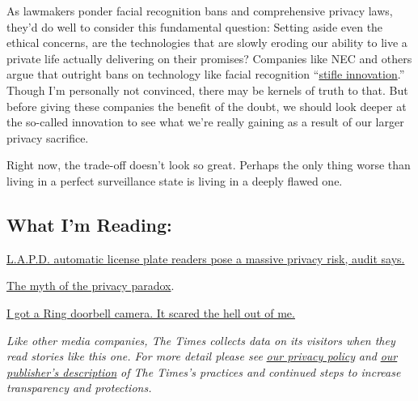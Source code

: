 As lawmakers ponder facial recognition bans and comprehensive privacy
laws, they'd do well to consider this fundamental question: Setting
aside even the ethical concerns, are the technologies that are slowly
eroding our ability to live a private life actually delivering on their
promises? Companies like NEC and others argue that outright bans on
technology like facial recognition
``\href{https://onezero.medium.com/nec-is-the-most-important-facial-recognition-company-youve-never-heard-of-12381d530510}{stifle
innovation}.'' Though I'm personally not convinced, there may be kernels
of truth to that. But before giving these companies the benefit of the
doubt, we should look deeper at the so-called innovation to see what
we're really gaining as a result of our larger privacy sacrifice.

Right now, the trade-off doesn't look so great. Perhaps the only thing
worse than living in a perfect surveillance state is living in a deeply
flawed one.

\hypertarget{what-im-reading}{%
\subsection{What I'm Reading:}\label{what-im-reading}}

\href{https://www.latimes.com/california/story/2020-02-13/privacy-risks-automatic-license-plate-readers-lapd}{L.A.P.D.
automatic license plate readers pose a massive privacy risk, audit
says.}

\href{https://papers.ssrn.com/sol3/papers.cfm?abstract_id=3536265}{The
myth of the privacy paradox}.

\href{https://nymag.com/intelligencer/2020/02/what-its-like-to-own-an-amazon-ring-doorbell-camera.html?utm_campaign=nym\&utm_medium=s1\&utm_source=tw}{I
got a Ring doorbell camera. It scared the hell out of me.}

\emph{Like other media companies, The Times collects data on its
visitors when they read stories like this one. For more detail please
see}
\href{https://help.nytimes.com/hc/en-us/articles/115014892108-Privacy-policy?module=inline}{\emph{our
privacy policy}} \emph{and}
\href{https://www.nytimes.com/2019/04/10/opinion/sulzberger-new-york-times-privacy.html?rref=collection\%2Fspotlightcollection\%2Fprivacy-project-does-privacy-matter\&action=click\&contentCollection=opinion\&region=stream\&module=stream_unit\&version=latest\&contentPlacement=8\&pgtype=collection}{\emph{our
publisher's description}} \emph{of The Times's practices and continued
steps to increase transparency and protections.}

